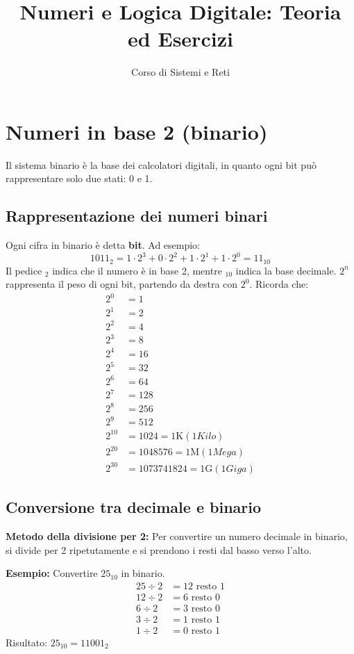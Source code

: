 \documentclass[12pt,a4paper]{article}
\title{Numeri e Logica Digitale: Teoria ed Esercizi}
\author{Corso di Sistemi e Reti}
\date{}
\begin{document}
\maketitle

\tableofcontents
\newpage

\section{Numeri in base 2 (binario)}

Il sistema binario è la base dei calcolatori digitali, in quanto ogni bit può rappresentare solo due stati: 0 e 1.

\subsection{Rappresentazione dei numeri binari}

Ogni cifra in binario è detta \textbf{bit}. Ad esempio:
\[
1011_2 = 1 \cdot 2^3 + 0 \cdot 2^2 + 1 \cdot 2^1 + 1 \cdot 2^0 = 11_{10}
\]
Il pedice $_2$ indica che il numero è in base 2, mentre $_{10}$ indica la base decimale.
$2^n$ rappresenta il peso di ogni bit, partendo da destra con $2^0$.
Ricorda che:
\[
\begin{aligned}
2^0 &= 1 \\
2^1 &= 2 \\
2^2 &= 4 \\
2^3 &= 8 \\
2^4 &= 16 \\
2^5 &= 32 \\
2^6 &= 64 \\
2^7 &= 128 \\
2^8 &= 256 \\
2^9 &= 512 \\
2^{10} &= 1024 = 1\text{K}  (1 Kilo) \\
2^{20} &= 1048576 = 1\text{M}  (1 Mega) \\
2^{30} &= 1073741824 = 1\text{G}  (1 Giga)
\end{aligned}
\]

\subsection{Conversione tra decimale e binario}

\textbf{Metodo della divisione per 2:}  
Per convertire un numero decimale in binario, si divide per 2 ripetutamente e si prendono i resti dal basso verso l'alto.

\textbf{Esempio:} Convertire $25_{10}$ in binario.
\begin{align*}
25 \div 2 &= 12 \text{ resto } 1 \\
12 \div 2 &= 6 \text{ resto } 0 \\
6 \div 2  &= 3 \text{ resto } 0 \\
3 \div 2  &= 1 \text{ resto } 1 \\
1 \div 2  &= 0 \text{ resto } 1
\end{align*}
Risultato: $25_{10} = 11001_2$
\end{document}
